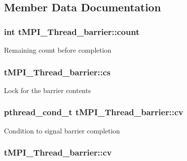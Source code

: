 \subsection{\-Member \-Data \-Documentation}
\hypertarget{structtMPI__Thread__barrier_a48eaa41e8bb9f42bf287f75f66acbf3f}{
\subsubsection[{count}]{\setlength{\rightskip}{0pt plus 5cm}int {\bf t\-M\-P\-I\-\_\-\-Thread\-\_\-barrier\-::count}}}\label{structtMPI__Thread__barrier_a48eaa41e8bb9f42bf287f75f66acbf3f}
\-Remaining count before completion \hypertarget{structtMPI__Thread__barrier_adacc4aafae56bf3a787ab3434cd327ae}{
\subsubsection[{cs}]{ {\bf t\-M\-P\-I\-\_\-\-Thread\-\_\-barrier\-::cs}}}\label{structtMPI__Thread__barrier_adacc4aafae56bf3a787ab3434cd327ae}
\-Lock for the barrier contents \hypertarget{structtMPI__Thread__barrier_aebf974065e952a130515fae5d86598a3}{
\subsubsection[{cv}]{\setlength{\rightskip}{0pt plus 5cm}pthread\-\_\-cond\-\_\-t {\bf t\-M\-P\-I\-\_\-\-Thread\-\_\-barrier\-::cv}}}\label{structtMPI__Thread__barrier_aebf974065e952a130515fae5d86598a3}
\-Condition to signal barrier completion \hypertarget{structtMPI__Thread__barrier_a36808c4fc06160450a84e5eeb8d008e9}{
\subsubsection[{cv}]{ {\bf t\-M\-P\-I\-\_\-\-Thread\-\_\-barrier\-::cv}}}\label{structtMPI__Thread__barrier_a36808c4fc06160450a84e5eeb8d008e9}
